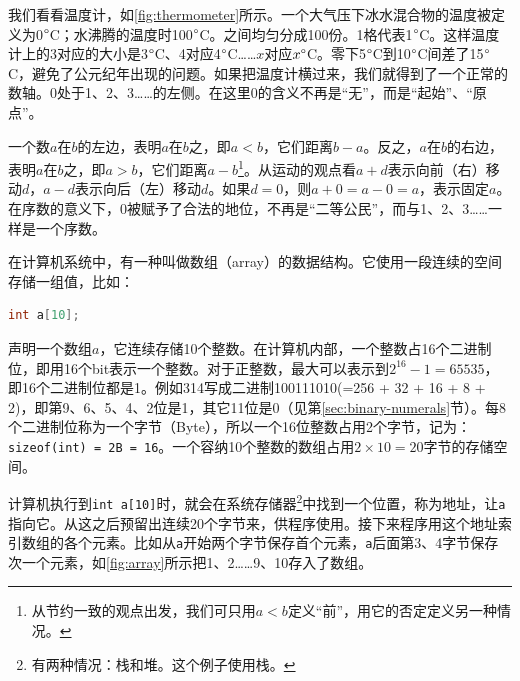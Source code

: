\documentclass[b5paper]{ctexart}
\begin{document}
我们看看温度计，如\cref{fig:thermometer}所示。一个大气压下冰水混合物的温度被定义为0$\degree$C；水沸腾的温度时100$\degree$C。之间均匀分成100份。1格代表1$\degree$C。这样温度计上的3对应的大小是3$\degree$C、4对应4$\degree$C……$x$对应$x \degree$C。零下5$\degree$C到10$\degree$C间差了15$\degree$C，避免了公元纪年出现的问题。如果把温度计横过来，我们就得到了一个正常的数轴。0处于1、2、3……的左侧。在这里0的含义不再是“无”，而是“起始”、“原点”。

\begin{center}
\end{center}

\label{sec:zero-as-ordinal} 
一个数$a$在$b$的左边，表明$a$在$b$之，即$a < b$，它们距离$b - a$。反之，$a$在$b$的右边，表明$a$在$b$之，即$a > b$，它们距离$a - b$\footnote{从节约一致的观点出发，我们可只用$a<b$定义“前”，用它的否定定义另一种情况。}。从运动的观点看$a + d$表示向前（右）移动$d$，$a - d$表示向后（左）移动$d$。如果$d = 0$，则$a + 0 = a - 0 = a$，表示固定$a$。在序数的意义下，0被赋予了合法的地位，不再是“二等公民”，而与1、2、3……一样是一个序数。

在计算机系统中，有一种叫做数组（array）的数据结构。它使用一段连续的空间存储一组值，比如：

\begin{lstlisting}[language=C, frame=single]
int a[10];
\end{lstlisting}

声明一个数组$a$，它连续存储10个整数。在计算机内部，一个整数占16个二进制位，即用16个bit表示一个整数。对于正整数，最大可以表示到$2^{16}-1 = 65535$，即16个二进制位都是1。例如314写成二进制100111010(=256 + 32 + 16 + 8 + 2)，即第9、6、5、4、2位是1，其它11位是0（见第\ref{sec:binary-numerals}节）。每8个二进制位称为一个字节（Byte），所以一个16位整数占用2个字节，记为：\lstinline|sizeof(int) = 2B = 16|。一个容纳10个整数的数组占用$2 \times 10 = 20$字节的存储空间。

计算机执行到\lstinline|int a[10]|时，就会在系统存储器\footnote{有两种情况：栈和堆。这个例子使用栈。}中找到一个位置，称为地址，让\lstinline|a|指向它。从这之后预留出连续20个字节来，供程序使用。接下来程序用这个地址索引数组的各个元素。比如从\lstinline|a|开始两个字节保存首个元素，\lstinline|a|后面第3、4字节保存次一个元素，如\cref{fig:array}所示把1、2……9、10存入了数组。
\end{document}
